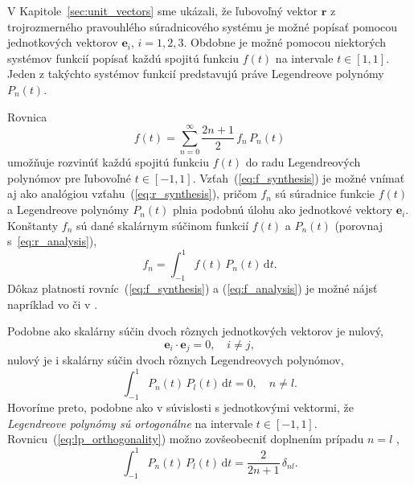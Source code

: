 \documentclass[a4paper, 12pt]{book}
\newcommand{\diff}{\mathrm d}
\let\vec\mathbf
\begin{document}
V Kapitole~\ref{sec:unit_vectors} sme ukázali, že ľubovoľný vektor $\vec r$ 
z trojrozmerného pravouhlého súradnicového systému je možné popísať pomocou 
jednotkových vektorov $\vec e_i$, $i = 1, 2, 3$.  Obdobne je možné pomocou 
niektorých systémov funkcií popísať každú spojitú funkciu $f(t)$ na intervale 
$t \in [1, 1]$.  Jeden z takýchto systémov funkcií predstavujú práve 
Legendreove polynómy~$P_n(t)$.

Rovnica
%
\begin{equation}
\label{eq:f_synthesis}
f(t) = \sum_{n = 0}^\infty \frac{2n + 1}{2} \, f_n \, P_n(t)
\end{equation}
%
umožňuje rozvinúť každú spojitú funkciu $f(t)$ do radu Legendreových polynómov 
pre ľubovoľné $t \in [-1, 1]$.  Vzťah~(\ref{eq:f_synthesis}) je možné vnímať aj 
ako analógiou vzťahu~(\ref{eq:r_synthesis}), pričom $f_n$ sú súradnice funkcie 
$f(t)$ a Legendreove polynómy $P_n(t)$ plnia podobnú úlohu ako jednotkové 
vektory $\vec e_i$.  Konštanty $f_n$ sú dané skalárnym súčinom funkcií $f(t)$ 
a $P_n(t)$ (porovnaj s~\ref{eq:r_analysis}),
%
\begin{equation}
\label{eq:f_analysis}
f_n = \int_{-1}^1 f(t) \, P_n(t) \, \diff t{.}
\end{equation}
%
Dôkaz platnosti rovníc~(\ref{eq:f_synthesis}) a (\ref{eq:f_analysis}) je možné 
nájsť napríklad vo \cite{Freeden2009} či v \cite{SansoGeoidDetermination}.

Podobne ako skalárny súčin dvoch rôznych jednotkových vektorov je nulový,
%
\begin{equation}
\label{eq:ei_orthogonality}
\vec e_i \cdot \vec e_j = 0{,} \quad i \neq j{,}
\end{equation}
%
nulový je i skalárny súčin dvoch rôznych Legendreovych polynómov,
%
\begin{equation}
\label{eq:lp_orthogonality}
\int_{-1}^1 P_n(t) \, P_l(t) \, \diff t = 0{,} \quad n \neq l{.}
\end{equation}
%
Hovoríme preto, podobne ako v súvislosti s jednotkovými vektormi, že 
\emph{Legendreove polynómy sú ortogonálne} na intervale $t \in [-1, 1].$  
Rovnicu~(\ref{eq:lp_orthogonality}) možno zovšeobecniť doplnením prípadu $n 
= l$ \citep[napríklad][]{Hobson},
%
\begin{equation}
\label{eq:lp_orthogonality_2}
\int_{-1}^1 P_n(t) \, P_l(t) \, \diff t = \frac{2}{2n + 1} \, \delta_{nl}{.}
\end{equation}
\end{document}
